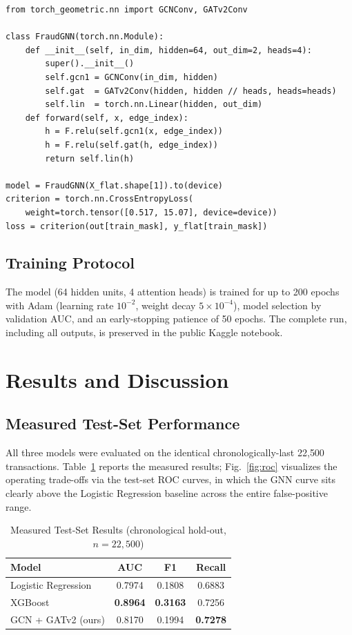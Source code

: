 \documentclass[conference]{IEEEtran}
\begin{document}
\begin{lstlisting}[style=pystyle,
  caption={GCN + GATv2 fraud detector (as deployed on Kaggle).},
  label={lst:gnn}]
from torch_geometric.nn import GCNConv, GATv2Conv

class FraudGNN(torch.nn.Module):
    def __init__(self, in_dim, hidden=64, out_dim=2, heads=4):
        super().__init__()
        self.gcn1 = GCNConv(in_dim, hidden)
        self.gat  = GATv2Conv(hidden, hidden // heads, heads=heads)
        self.lin  = torch.nn.Linear(hidden, out_dim)
    def forward(self, x, edge_index):
        h = F.relu(self.gcn1(x, edge_index))
        h = F.relu(self.gat(h, edge_index))
        return self.lin(h)

model = FraudGNN(X_flat.shape[1]).to(device)
criterion = torch.nn.CrossEntropyLoss(
    weight=torch.tensor([0.517, 15.07], device=device))
loss = criterion(out[train_mask], y_flat[train_mask])
\end{lstlisting}

\subsection{Training Protocol}
The model (64 hidden units, 4 attention heads) is trained for up to 200
epochs with Adam (learning rate $10^{-2}$, weight decay $5\times10^{-4}$),
model selection by validation AUC, and an early-stopping patience of 50
epochs. The complete run, including all outputs, is preserved in the
public Kaggle notebook.

\section{Results and Discussion}
\subsection{Measured Test-Set Performance}
All three models were evaluated on the identical chronologically-last
22{,}500 transactions. Table~\ref{tab:results} reports the measured
results; Fig.~\ref{fig:roc} visualizes the operating trade-offs via the
test-set ROC curves, in which the GNN curve sits clearly above the
Logistic Regression baseline across the entire false-positive range.

\begin{table}[htbp]
\caption{Measured Test-Set Results (chronological hold-out, $n{=}22{,}500$)}
\label{tab:results}
\centering
\footnotesize
\begin{tabular}{lccc}
\hline
\textbf{Model} & \textbf{AUC} & \textbf{F1} & \textbf{Recall} \\
\hline
Logistic Regression & 0.7974 & 0.1808 & 0.6883 \\
XGBoost             & \textbf{0.8964} & \textbf{0.3163} & 0.7256 \\
GCN + GATv2 (ours)  & 0.8170 & 0.1994 & \textbf{0.7278} \\
\hline
\end{tabular}
\end{table}
\end{document}
